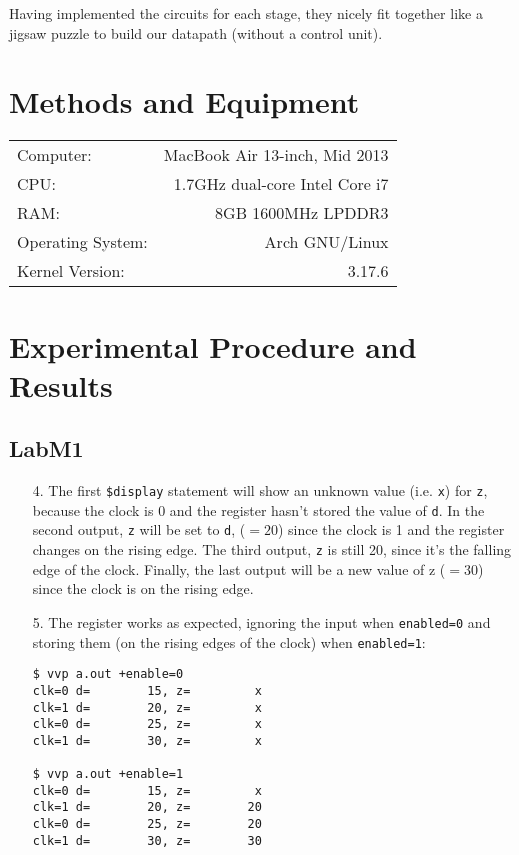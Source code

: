 \documentclass{article}
\begin{document}
Having implemented the circuits for each stage, they nicely fit together like a jigsaw
puzzle to build our datapath (without a control unit).


\section{Methods and Equipment}

\begin{center}
\begin{tabular}{l r}
Computer: & MacBook Air 13-inch, Mid 2013 \\
CPU: & 1.7GHz dual-core Intel Core i7 \\
RAM: & 8GB 1600MHz LPDDR3 \\
Operating System: & Arch GNU/Linux \\
Kernel Version: & 3.17.6
\end{tabular}
\end{center}


\section{Experimental Procedure and Results}

\subsection{LabM1}
\begin{enumerate}
\item[4. ] The first \verb#$display# statement will show an unknown value
(i.e. \verb$x$) for \verb$z$, because the clock is 0 and the register hasn't
stored the value of \verb$d$. In the second output, \verb$z$ will be set to
\verb$d$, ($= 20$) since the clock is 1 and the register changes on the rising
edge. The third output, \verb$z$ is still 20, since it's the falling edge of the
clock. Finally, the last output will be a new value of z ($= 30$) since the clock
is on the rising edge.

\pagebreak

\item[5. ] The register works as expected, ignoring the input when \verb$enabled=0$
and storing them (on the rising edges of the clock) when \verb$enabled=1$:
\begin{verbatim}
$ vvp a.out +enable=0
clk=0 d=        15, z=         x
clk=1 d=        20, z=         x
clk=0 d=        25, z=         x
clk=1 d=        30, z=         x

$ vvp a.out +enable=1
clk=0 d=        15, z=         x
clk=1 d=        20, z=        20
clk=0 d=        25, z=        20
clk=1 d=        30, z=        30
\end{verbatim}
\end{enumerate}
\end{document}
